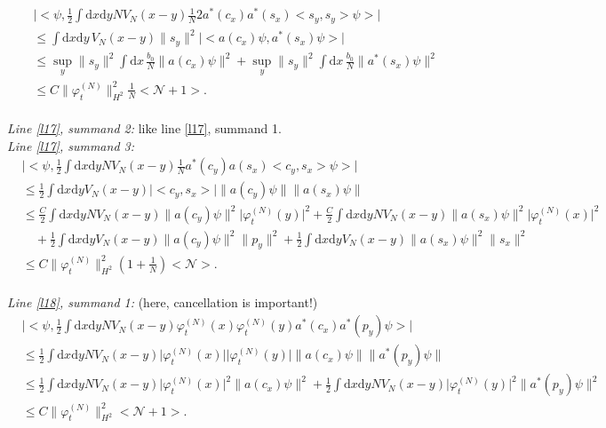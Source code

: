 \documentclass[11pt,a4paper,draft,DIV11]{scrartcl}	%
\newcommand{\di}{\textrm{d}}		%
\newcommand{\Ncal}{\mathcal{N}}		%
\newcommand{\estlist}[2]{\emph{\vspace{.3em}\\Line \ref{l#1}, summand #2:}}
\newcommand{\nestlist}[2]{line \ref{l#1}, summand #2}
\newcommand{\Nestlist}[2]{Line \ref{l#1}, summand #2}
\newcommand{\scal}[2]{\big<#1,#2\big>} %
\newcommand{\norm}[1]{\lVert#1\rVert}	%
\newcommand{\ev}[1]{\big<#1\big>}	%
\newcommand{\ph}{\varphi_t^{(N)}}	%
\newcommand{\dxyNV}{\frac{1}{2}\int \di x\di y N V_N(x-y)} %
\newcommand{\dxyV}{\frac{1}{2}\int \di x\di y V_N(x-y)} %
\begin{document}
\begin{fleqn}[0.5em]
\begin{align*}
 & \lvert \scal{\psi}{\dxyNV \frac{1}{N}2 a^\ast(c_x)a^\ast(s_x) \scal{s_y}{s_y}\psi} \rvert \\
& \leq \int \di x\di y\, V_N(x-y) \norm{s_y}^2 \lvert \scal{a(c_x)\psi}{a^\ast(s_x)\psi}\rvert \\
& \leq \sup_y \norm{s_y}^2 \int \di x\, \frac{b_0}{N} \norm{a(c_x)\psi}^2 + \sup_y \norm{s_y}^2 \int \di x\, \frac{b_0}{N} \norm{a^\ast(s_x)\psi}^2 \\
& \leq C \norm{\ph}_{H^2}^2 \frac{1}{N}\ev{\Ncal+1}.
\end{align*}
\emph{\vspace{.3em}\\\Nestlist{17}{2}:} like \nestlist{17}{1}.\newline
\estlist{17}{3}
\begin{align*}
& \lvert \scal{\psi}{\dxyNV \frac{1}{N} a^\ast(c_y) a(s_x) \scal{c_y}{s_x} \psi} \rvert \\
& \leq \dxyV \lvert \scal{c_y}{s_x} \rvert \norm{a(c_y)\psi} \norm{a(s_x)\psi} \\
& \leq \frac{C}{2}\int \di x\di y N V_N(x-y) \norm{a(c_y)\psi}^2 \lvert\ph(y)\rvert^2 + \frac{C}{2}\int \di x\di y N V_N(x-y) \norm{a(s_x)\psi}^2 \lvert \ph(x)\rvert^2 \\
& \quad + \dxyV \norm{a(c_y)\psi}^2 \norm{p_y}^2 + \dxyV \norm{a(s_x)\psi}^2 \norm{s_x}^2 \\
& \leq C \norm{\ph}_{H^2}^2 \left(1+\frac{1}{N}\right)\ev{\Ncal}.
\end{align*}
\estlist{18}{1} (here, cancellation is important!)
\begin{align*}
& \lvert \scal{\psi}{\dxyNV \ph(x)\ph(y) a^\ast(c_x) a^\ast(p_y)\psi} \rvert \\
& \leq \dxyNV \lvert\ph(x)\rvert \lvert\ph(y)\rvert \norm{a(c_x)\psi} \norm{a^\ast(p_y)\psi}\\
& \leq \dxyNV \lvert \ph(x)\rvert^2 \norm{a(c_x)\psi}^2 + \dxyNV \lvert\ph(y)\rvert^2 \norm{a^\ast(p_y)\psi}^2 \\
& \leq C\norm{\ph}_{H^2}^2 \ev{\Ncal+1}. 
\end{align*}

\end{fleqn}
\end{document}
